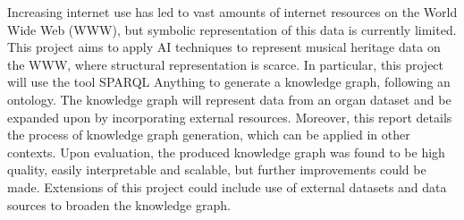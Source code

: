 Increasing internet use has led to vast amounts of internet resources on the World Wide Web (WWW), but symbolic representation of this data is currently limited. This project aims to apply AI techniques to represent musical heritage data on the WWW, where structural representation is scarce. In particular, this project will use the tool SPARQL Anything to generate a knowledge graph, following an ontology. The knowledge graph will represent data from an organ dataset and be expanded upon by incorporating external resources. Moreover, this report details the process of knowledge graph generation, which can be applied in other contexts. Upon evaluation, the produced knowledge graph was found to be high quality, easily interpretable and scalable, but further improvements could be made. Extensions of this project could include use of external datasets and data sources to broaden the knowledge graph. 

